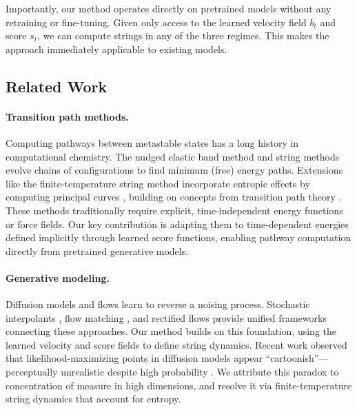 \documentclass{article}
\theoremstyle{plain}
\theoremstyle{definition}
\theoremstyle{remark}
\begin{document}
Importantly, our method operates directly on pretrained models without any retraining or fine-tuning. Given only access to the learned velocity field $b_t$ and score $s_t$, we can compute strings in any of the three regimes. This makes the approach immediately applicable to existing models.


\subsection{Related Work}

\paragraph{Transition path methods.} Computing pathways between metastable states has a long history in computational chemistry. The nudged elastic band method \citep{henkelman2000climbing} and string methods \citep{e2002string, ren2007simplified,maragliano2006string} evolve chains of configurations to find minimum (free) energy paths. Extensions like the finite-temperature string method \citep{e2005finite} incorporate entropic effects by computing principal curves \citep{hastie1989principal}, building on concepts from transition path theory \citep{vanden2006towards, e2010transition}. These methods traditionally require explicit, time-independent energy functions or force fields. Our key contribution is adapting them to time-dependent energies defined implicitly through learned score functions, enabling pathway computation directly from pretrained generative models.

\paragraph{Generative modeling.} Diffusion models and flows \citep{ho2020denoising, song2021scorebased} learn to reverse a noising process. Stochastic interpolants \citep{albergo2023building,albergo2023stochastic}, flow matching \citep{lipman2022}, and rectified flows \citep{liu2022} provide unified frameworks connecting these approaches. Our method builds on this foundation, using the learned velocity and score fields to define string dynamics. Recent work observed that likelihood-maximizing points in diffusion models appear ``cartoonish''---perceptually unrealistic despite high probability \citep{guth2025learning, karczewski2025diffusion}. We attribute this paradox to concentration of measure in high dimensions, and resolve it via finite-temperature string dynamics that account for entropy.
\end{document}
